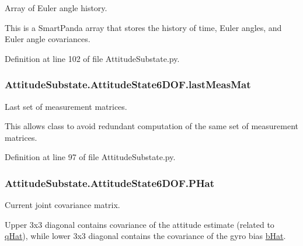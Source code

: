 Array of Euler angle history. 

This is a Smart\+Panda array that stores the history of time, Euler angles, and Euler angle covariances. 

Definition at line 102 of file Attitude\+Substate.\+py.

\subsubsection[{\texorpdfstring{last\+Meas\+Mat}{lastMeasMat}}]{\setlength{\rightskip}{0pt plus 5cm}Attitude\+Substate.\+Attitude\+State6\+D\+O\+F.\+last\+Meas\+Mat}\hypertarget{classAttitudeSubstate_1_1AttitudeState6DOF_ae23a47fae330703aa8a50b207275c9b0}{}\label{classAttitudeSubstate_1_1AttitudeState6DOF_ae23a47fae330703aa8a50b207275c9b0}


Last set of measurement matrices. 

This allows class to avoid redundant computation of the same set of measurement matrices. 

Definition at line 97 of file Attitude\+Substate.\+py.

\subsubsection[{\texorpdfstring{P\+Hat}{PHat}}]{\setlength{\rightskip}{0pt plus 5cm}Attitude\+Substate.\+Attitude\+State6\+D\+O\+F.\+P\+Hat}\hypertarget{classAttitudeSubstate_1_1AttitudeState6DOF_a6aac27efa4d5962865f7d3f701c919ab}{}\label{classAttitudeSubstate_1_1AttitudeState6DOF_a6aac27efa4d5962865f7d3f701c919ab}


Current joint covariance matrix. 

Upper 3x3 diagonal contains covariance of the attitude estimate (related to \hyperlink{classAttitudeSubstate_1_1AttitudeState6DOF_a36a58a47280151dd544762d9a1d5c35d}{q\+Hat}), while lower 3x3 diagonal contains the covariance of the gyro bias \hyperlink{classAttitudeSubstate_1_1AttitudeState6DOF_a1b8eff7c89a7a03875dc04263da7ec18}{b\+Hat}. 

